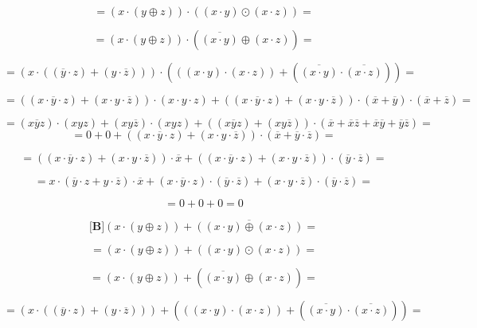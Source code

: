 \begin{enumerate}
\begin{enumerate}
\begin{enumerate}
\begin{enumerate}
        \[{= {{({x \cdot {({y \oplus z})}})} \cdot {({{({x \cdot y})} \odot {({x \cdot z})}})}}} =\]

        \[{= {{({x \cdot {({y \oplus z})}})} \cdot {({\overline{({x\cdot y})} \oplus {({x \cdot z})}})}}} =\]

        \[{= {{({x \cdot {({{({\overline{y} \cdot z})} + {({y \cdot \overline{z}})}})}})} \cdot {({{({{({x \cdot y})} \cdot {({x \cdot z})}})} + {({\overline{({x\cdot y})} \cdot \overline{({x\cdot z})}})}})}}} =\]

        \[{= {{{({{({{x \cdot \overline{y}} \cdot z})} + {({{x \cdot y} \cdot \overline{z}})}})} \cdot {({{x \cdot y} \cdot z})}} + {{{({{({{x \cdot \overline{y}} \cdot z})} + {({{x \cdot y} \cdot \overline{z}})}})} \cdot {({\overline{x} + \overline{y}})}} \cdot {({\overline{x} + \overline{z}})}}}} =\]

        \[{= {{{{({x\overline{y}z})} \cdot {({xyz})}} + {{({xy\overline{z}})} \cdot {({xyz})}}} + {{({{({x\overline{y}z})} + {({xy\overline{z}})}})} \cdot {({{\overline{x} + \overline{x}}{\overline{z} + \overline{x}}{\overline{y} + \overline{y}}\overline{z}})}}}} =\]
        \[{= {{0 + 0} + {{({{({{x \cdot \overline{y}} \cdot z})} + {({{x \cdot y} \cdot \overline{z}})}})} \cdot {({\overline{x} + {\overline{y} \cdot \overline{z}}})}}}} =\]

        \[{= {{{({{({{x \cdot \overline{y}} \cdot z})} + {({{x \cdot y} \cdot \overline{z}})}})} \cdot \overline{x}} + {{({{({{x \cdot \overline{y}} \cdot z})} + {({{x \cdot y} \cdot \overline{z}})}})} \cdot {({\overline{y} \cdot \overline{z}})}}}} =\]

        \[{= {{{{x \cdot {({{\overline{y} \cdot z} + {y \cdot \overline{z}}})}} \cdot \overline{x}} + {{({{x \cdot \overline{y}} \cdot z})} \cdot {({\overline{y} \cdot \overline{z}})}}} + {{({{x \cdot y} \cdot \overline{z}})} \cdot {({\overline{y} \cdot \overline{z}})}}}} =\]

        \[{= {{0 + 0} + 0}} = 0\]

        \[{\lbrack\mathbf{B}\rbrack}{{{({x \cdot {({y \oplus z})}})} + \overline{({{({x\cdot y})}\oplus{({x\cdot z})}})}} =}\]

        \[{= {{({x \cdot {({y \oplus z})}})} + {({{({x \cdot y})} \odot {({x \cdot z})}})}}} =\]

        \[{= {{({x \cdot {({y \oplus z})}})} + {({\overline{({x\cdot y})} \oplus {({x \cdot z})}})}}} =\]

        \[{= {{({x \cdot {({{({\overline{y} \cdot z})} + {({y \cdot \overline{z}})}})}})} + {({{({{({x \cdot y})} \cdot {({x \cdot z})}})} + {({\overline{({x\cdot y})} \cdot \overline{({x\cdot z})}})}})}}} =\]


\end{enumerate}
\end{enumerate}
\end{enumerate}
\end{enumerate}
